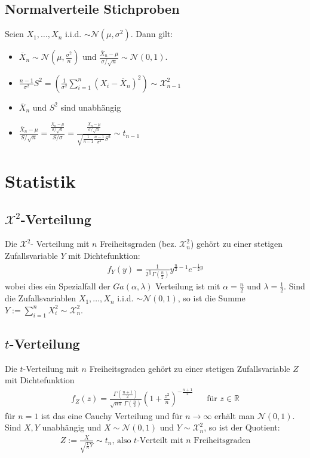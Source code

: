 \documentclass[8pt]{extarticle}
\newcommand{\R}{\mathbb{R}}
\newcommand{\X}{\mathcal{X}}
\newcommand{\ra}{\rightarrow}
\newcommand{\Sn}{\sum_{i = 1}^n}
\newcommand{\zufallsvariablen}{X_1, \dots, X_n}
\newcommand{\Normalverteilt}{\mathcal{N}  (\mu, \sigma^2)}
\newcommand{\Standardnormalverteilt}{\mathcal{N}  (0, 1)}
\begin{document}
\begin{multicols*}{3}
  \subsection*{Normalverteile Stichproben}
  Seien $\zufallsvariablen$ i.i.d. $\sim \Normalverteilt$. Dann gilt:
  \begin{itemize}
    \item $\overline{X}_n \sim \mathcal{N} (\mu, \frac{\sigma^2}{n})$
          und $\frac{\overline{X}_n - \mu}{\sigma / \sqrt{n}} \sim \Standardnormalverteilt$.
    \item $\frac{n-1}{\sigma^2} S^2 = \left( \frac{1}{\sigma^2} \Sn  (X_i - \overline{X}_n)^2 \right) \sim \mathcal{X}^2_{n-1}$
    \item $\overline{X}_n$ und $S^2$ sind unabhängig
    \item $\frac{\overline{X}_n - \mu}{S / \sqrt{n}} = \frac{ \frac{\overline{X}_n - \mu}{\sigma / \sqrt{n}} }{S / \sigma} = \frac{ \frac{\overline{X}_n - \mu}{\sigma / \sqrt{n}} }{\sqrt{\frac{1}{n-1} \frac{n-1}{\sigma^2} S^2}} \sim t_{n-1}$
  \end{itemize}
  \hypertarget{sec:4}{\section{Statistik}}
  \subsection*{$\X^2$-Verteilung}
  Die $\X^2$- Verteilung mit $n$ Freiheitsgraden  (bez. $\X^2_n$) gehört zu einer
  stetigen Zufallsvariable $Y$ mit Dichtefunktion:
  \begin{align*}
    f_Y (y) = \frac{1}{2^{\frac{n}{2}}  \Gamma (\frac{n}{2})} y^{\frac{n}{2} - 1} e^{-\frac{1}{2} y}
  \end{align*}
  wobei dies ein Spezialfall der $Ga (\alpha, \lambda)$ Verteilung ist mit
  $\alpha = \frac{n}{2}$ und $\lambda = \frac{1}{2}$. Sind die Zufallsvariablen
  $\zufallsvariablen$ i.i.d. $\sim \Standardnormalverteilt$, so ist die Summe
  $Y := \Sn X_i^2 \sim \X^2_n$.
  \subsection*{$t$-Verteilung}
  Die $t$-Verteilung mit $n$ Freiheitsgraden gehört zu einer stetigen
  Zufallsvariable $Z$ mit Dichtefunktion
  \begin{align*}
    f_Z (z) = \frac{\Gamma (\frac{n+1}{2})}{\sqrt{n \pi} \, \Gamma (\frac{n}{2})} \left( 1 + \frac{z^2}{n} \right)^{-\frac{n+1}{2}}
     &  & \text{für } z \in \R
  \end{align*}
  für $n = 1$ ist das eine Cauchy Verteilung und für $n \ra \infty$ erhält man
  $\Standardnormalverteilt$. Sind $X, Y$ unabhängig und $X \sim \Standardnormalverteilt$
  und $Y \sim \X^2_n$, so ist der Quotient:
  \begin{align*}
    Z := \frac{X}{\sqrt{\frac{1}{n} Y}} \sim t_n \text{, also $t$-Verteilt mit $n$ Freiheitsgraden}
  \end{align*}

\end{multicols*}
\end{document}

